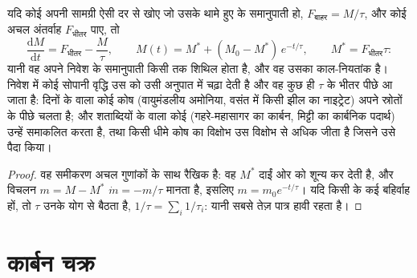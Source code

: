 \begin{theorem}[एक-डिब्बा प्रतिरूप]\label{thm:b2:biogeochemical-cycles:box}
यदि कोई  अपनी सामग्री ऐसी दर से खोए जो उसके थामे हुए के
समानुपाती हो, $F_{\text{बाहर}} = M/\tau$, और कोई अचल अंतर्वाह
$F_{\text{भीतर}}$ पाए, तो
\[
\frac{\mathrm{d}M}{\mathrm{d}t} = F_{\text{भीतर}} - \frac{M}{\tau},
\qquad
M(t) = M^{*} + (M_0 - M^{*})\,e^{-t/\tau}, \qquad M^{*} = F_{\text{भीतर}}\tau :
\]
यानी वह  अपने निवेश के समानुपाती किसी  तक
शिथिल होता है, और वह  उसका काल-नियतांक है। निवेश में कोई
सोपानी वृद्धि उस  को उसी अनुपात में चढ़ा देती है और वह 
कुछ ही $\tau$ के भीतर पीछे आ जाता है: दिनों के  वाला कोई कोष
(वायुमंडलीय अमोनिया, वसंत में किसी झील का नाइट्रेट) अपने
स्रोतों के पीछे चलता है; और शताब्दियों के  वाला कोई (गहरे-महासागर का कार्बन,
मिट्टी का कार्बनिक पदार्थ) उन्हें समाकलित करता है, तथा किसी
धीमे कोष का विक्षोभ उस विक्षोभ से अधिक जीता है जिसने उसे पैदा किया।
\end{theorem}
\begin{proof}
वह समीकरण अचल गुणांकों के साथ रैखिक है: वह 
$M^{*}$ दाईं ओर को शून्य कर देती है, और विचलन $m = M - M^{*}$
$\dot m = -m/\tau$ मानता है, इसलिए $m = m_0 e^{-t/\tau}$। यदि किसी 
के कई बहिर्वाह हों, तो $\tau$ उनके योग से बैठता है, $1/\tau = \sum_i
1/\tau_i$: यानी सबसे तेज़ पात्र हावी रहता है।
\end{proof}

\section{कार्बन चक्र}

